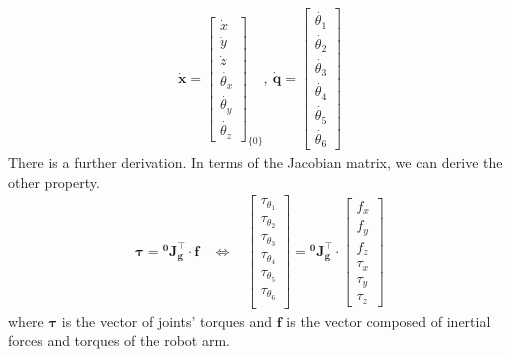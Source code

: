 \begin{equation}
\begin{split}
\boldsymbol{\dot{x}}
=
\begin{bmatrix}
\dot{x}\\
\dot{y}\\
\dot{z}\\
\dot{\theta _x}\\
\dot{\theta _y}\\
\dot{\theta _z}
\end{bmatrix}_{\!\{0\}}
,\ 
\boldsymbol{\dot{q}}
=
\begin{bmatrix}
\dot{\theta _1} \\ 
\dot{\theta _2} \\ 
\dot{\theta _3} \\ 
\dot{\theta _4} \\ 
\dot{\theta _5} \\ 
\dot{\theta _6} 
\end{bmatrix}
\end{split}
\end{equation}
There is a further derivation. In terms of the Jacobian matrix, we can derive the other property.
\begin{equation}
\begin{split}
\boldsymbol{\tau } = \mathbf{^0\!J^\top _g} \cdot \boldsymbol{f}\ \ \ \ 
\Leftrightarrow \ \ \ \ 
\begin{bmatrix}
\tau_{\theta _1} \\ 
\tau_{\theta _2} \\ 
\tau_{\theta _3} \\ 
\tau_{\theta _4} \\ 
\tau_{\theta _5} \\ 
\tau_{\theta _6} \\ 
\end{bmatrix}
=
\mathbf{^0\!J^\top _g} 
\cdot
\begin{bmatrix}
f_x \\ 
f_y \\ 
f_z \\ 
\tau_{x} \\ 
\tau_{y} \\ 
\tau_{z}
\end{bmatrix}
\end{split}
\end{equation}
where $\boldsymbol{\tau }$ is the vector of joints' torques and $\boldsymbol{f}$ is the vector composed of inertial forces and torques of the robot arm.
